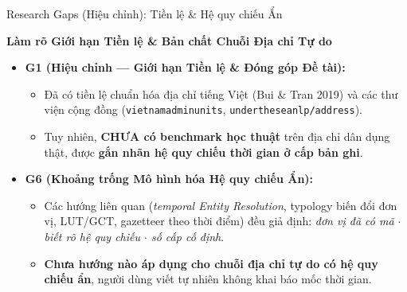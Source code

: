 \documentclass[aspectratio=169,9pt]{beamer}
\begin{document}
\begin{frame}{Research Gaps (Hiệu chỉnh): Tiền lệ \& Hệ quy chiếu Ẩn}
  \vspace{-0.05cm}
  \centerline{\large\textbf{Làm rõ Giới hạn Tiền lệ \& Bản chất Chuỗi Địa chỉ Tự do}}
  \vspace{0.15cm}

  \begin{itemize}
    \setlength{\itemsep}{8pt}
    \item \textbf{G1 (Hiệu chỉnh — Giới hạn Tiền lệ \& Đóng góp Đề tài):}
      \begin{itemize}
        \setlength{\itemsep}{2.5pt}
        \item Đã có tiền lệ chuẩn hóa địa chỉ tiếng Việt (Bui \& Tran 2019) và các thư viện cộng đồng (\texttt{vietnamadminunits}, \texttt{undertheseanlp/address}).
        \item Tuy nhiên, \textbf{CHƯA có benchmark học thuật} trên địa chỉ dân dụng thật, được \textbf{gắn nhãn hệ quy chiếu thời gian ở cấp bản ghi}.
      \end{itemize}

    \item \textbf{G6 (Khoảng trống Mô hình hóa Hệ quy chiếu Ẩn):}
      \begin{itemize}
        \setlength{\itemsep}{2.5pt}
        \item Các hướng liên quan (\textit{temporal Entity Resolution}, typology biến đổi đơn vị, LUT/GCT, gazetteer theo thời điểm) đều giả định: \textit{đơn vị đã có mã $\cdot$ biết rõ hệ quy chiếu $\cdot$ số cấp cố định}.
        \item \textbf{Chưa hướng nào áp dụng cho chuỗi địa chỉ tự do có hệ quy chiếu ẩn}, người dùng viết tự nhiên không khai báo mốc thời gian.
      \end{itemize}
  \end{itemize}
\end{frame}
\end{document}
